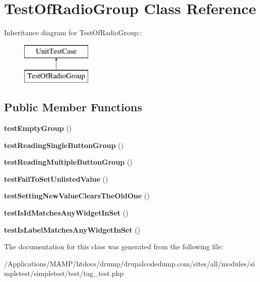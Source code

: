 \hypertarget{class_test_of_radio_group}{
\section{TestOfRadioGroup Class Reference}
\label{class_test_of_radio_group}
}
Inheritance diagram for TestOfRadioGroup::\begin{figure}[H]
\begin{center}
\leavevmode
\includegraphics[height=2cm]{class_test_of_radio_group}
\end{center}
\end{figure}
\subsection*{Public Member Functions}
\begin{DoxyCompactItemize}
\item 
\hypertarget{class_test_of_radio_group_a20f81da8067ff75c61a7c3973a107b0d}{
{\bfseries testEmptyGroup} ()}
\label{class_test_of_radio_group_a20f81da8067ff75c61a7c3973a107b0d}

\item 
\hypertarget{class_test_of_radio_group_ad50cbe4a3f3b3cf9215acc0e95022750}{
{\bfseries testReadingSingleButtonGroup} ()}
\label{class_test_of_radio_group_ad50cbe4a3f3b3cf9215acc0e95022750}

\item 
\hypertarget{class_test_of_radio_group_aec1c02c815830ffcf75ca8464e0af40b}{
{\bfseries testReadingMultipleButtonGroup} ()}
\label{class_test_of_radio_group_aec1c02c815830ffcf75ca8464e0af40b}

\item 
\hypertarget{class_test_of_radio_group_a2761eea47c96269ba41f74b391749f00}{
{\bfseries testFailToSetUnlistedValue} ()}
\label{class_test_of_radio_group_a2761eea47c96269ba41f74b391749f00}

\item 
\hypertarget{class_test_of_radio_group_a239417367a85cd83cf6dce3c229c0bc7}{
{\bfseries testSettingNewValueClearsTheOldOne} ()}
\label{class_test_of_radio_group_a239417367a85cd83cf6dce3c229c0bc7}

\item 
\hypertarget{class_test_of_radio_group_a0e00a72b6034afd84c47bcf9c4c8c75c}{
{\bfseries testIsIdMatchesAnyWidgetInSet} ()}
\label{class_test_of_radio_group_a0e00a72b6034afd84c47bcf9c4c8c75c}

\item 
\hypertarget{class_test_of_radio_group_acde789502c7e6d396163962888e0c149}{
{\bfseries testIsLabelMatchesAnyWidgetInSet} ()}
\label{class_test_of_radio_group_acde789502c7e6d396163962888e0c149}

\end{DoxyCompactItemize}


The documentation for this class was generated from the following file:\begin{DoxyCompactItemize}
\item 
/Applications/MAMP/htdocs/drump/drupalcodedump.com/sites/all/modules/simpletest/simpletest/test/tag\_\-test.php\end{DoxyCompactItemize}
